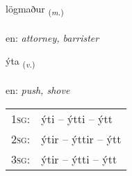 \documentclass[frontgrid, backgrid]{flacards}\usepackage[]{graphicx}\usepackage[]{color}
\begin{document}
\renewcommand{\flhead}{\vskip5pt \fboxsep=0pt {\small\bfseries\footnotesize Nafnorð | Noun}}
\renewcommand{\fcfoot}{\vskip5pt \fboxsep=0pt \hspace{2pt}{\small\bfseries\footnotesize 2K}}

\renewcommand{\blhead}{\vskip5pt {\small\bfseries\footnotesize Nafnorð | Noun }}
\renewcommand{\bcfoot}{\vskip5pt \hspace{2pt}{\small\bfseries\footnotesize 2K}}


{lögmaður \small{\textsubscript{(\textit{m.})}} \\[1ex] %
\textphonetic{[lœɣmaðʏr]} \\
en: \emph{attorney, barrister} \\  [2ex]
\renewcommand*{\arraystretch}{0.8}
}

\renewcommand{\flhead}{\vskip5pt \fboxsep=0pt {\small\bfseries\footnotesize Sagnorð | Verb}}
\renewcommand{\fcfoot}{\vskip5pt \fboxsep=0pt \hspace{2pt}{\small\bfseries\footnotesize 2K}}

\renewcommand{\blhead}{\vskip5pt {\small\bfseries\footnotesize Sagnorð | Verb }}
\renewcommand{\bcfoot}{\vskip5pt \hspace{2pt}{\small\bfseries\footnotesize 2K}}


{ýta \small{\textsubscript{(\textit{v.})}} \\[1ex] %
\textphonetic{[iːta]} \\
en: \emph{push, shove} \\  [2ex]
\renewcommand*{\arraystretch}{0.8}
\begin{tabular}{p{1cm}l}
\textsc{1sg}: & ýti -- ýtti -- ýtt \\ 
\textsc{2sg}: & ýtir -- ýttir -- ýtt \\ 
\textsc{3sg}: & ýtir -- ýtti -- ýtt \\ 
\end{tabular}
}
\end{document}
